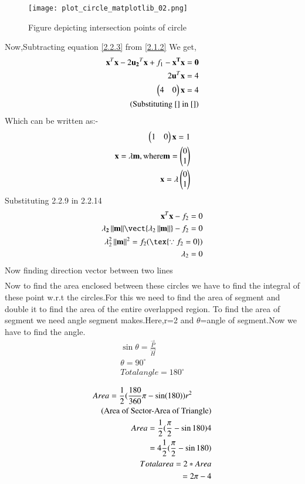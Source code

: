 \documentclass[journal,12pt,twocolumn]{IEEEtran}
\begin{document}
 \begin{figure}[h!]
	\centering
	\texttt{[image: plot\_circle\_matplotlib\_02.png]}
	\caption{Figure depicting intersection points of circle}
	\label{myfig}
\end{figure}
Now,Subtracting equation \eqref{2.2.3} from \eqref{2.1.2} We get,
 \begin{align}
 {\mathbf{x}^{T}\mathbf{x}-2\mathbf{u_2}^T\mathbf{x}}+f_1-\bf{x}^{T}\bf{x}=0\\
 2\mathbf{u}^{T}\mathbf{x}=4\\
 \begin{pmatrix}4&0\end{pmatrix}\mathbf{x}=4\\\text{(Substituting \eqref{} in \eqref{})}
 \end{align}
 Which can be written as:-
 \begin{align}
 \begin{pmatrix}1&0\end{pmatrix}\mathbf{x}=1\\
 \mathbf{x} = \lambda \mathbf{m}, \text{where} \mathbf{m} = \begin{pmatrix}0\\1\end{pmatrix}\\
 \mathbf{x} = \lambda \begin{pmatrix}0\\1\end{pmatrix}\\ 
 \end{align}
 Substituting 2.2.9 in 2.2.14
  \begin{align}
  \vec{x}^T\vec{x} - f_2 = 0\\
 \vec{\lambda_2\norm{\vec{m}}}\vect{\lambda_2\norm{\vec{m}}} - f_2 = 0\\
\lambda_2^2\norm{\vec{m}}^2=f_2 (\tex{\because f_2=0})\\
\lambda_2=0
 \end{align}
 Now finding direction vector between two lines\\
 \begin{align}
 \end{align}
 Now to find the area enclosed between these circles we have to find the integral of these point w.r.t the circles.For this we need to find the area of segment and double it to find the area of the entire overlapped region. To find the area of segment we need angle segment makes.Here,r=2 and $\theta$=angle of segment.Now we have to find the angle.\\ 
\begin{align*}
\sin \theta=\frac{\vec{P}}{\vec{H}}\\ 
\theta=90^{\circ}\\
Total angle=180^{\circ}\\
\end{align*}
 \begin{align}
 \begin{multlined}
 Area=\frac{1}{2}(\frac{180}{360}\pi-\sin (180))r^{2}\\
 $(Area of Sector-Area of Triangle)$
\end{multlined}\\
Area={\frac{1}{2}}(\frac{\pi}{2}-\sin 180)4\\
=4{\frac{1}{2}}(\frac{\pi}{2}-\sin 180)\\
Total area=2*Area\\
=2\pi-4
\end{align}
 
  
\end{document}
